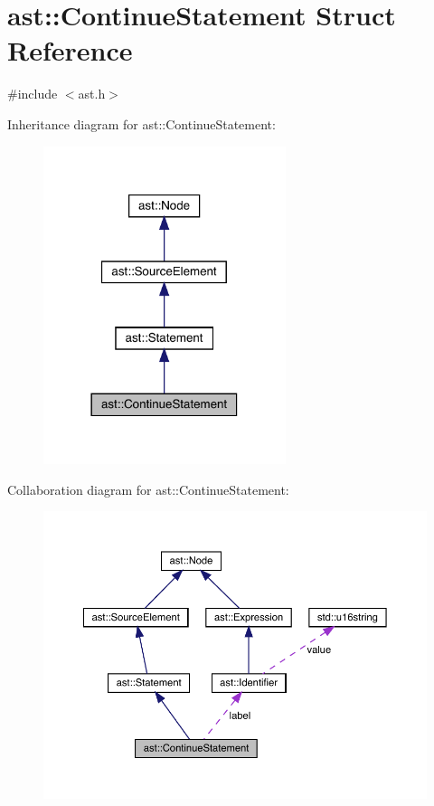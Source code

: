\hypertarget{structast_1_1_continue_statement}{}\section{ast\+:\+:Continue\+Statement Struct Reference}
\label{structast_1_1_continue_statement}


{\ttfamily \#include $<$ast.\+h$>$}



Inheritance diagram for ast\+:\+:Continue\+Statement\+:
\nopagebreak
\begin{figure}[H]
\begin{center}
\leavevmode
\includegraphics[width=201pt]{structast_1_1_continue_statement__inherit__graph}
\end{center}
\end{figure}


Collaboration diagram for ast\+:\+:Continue\+Statement\+:
\nopagebreak
\begin{figure}[H]
\begin{center}
\leavevmode
\includegraphics[width=350pt]{structast_1_1_continue_statement__coll__graph}
\end{center}
\end{figure}
